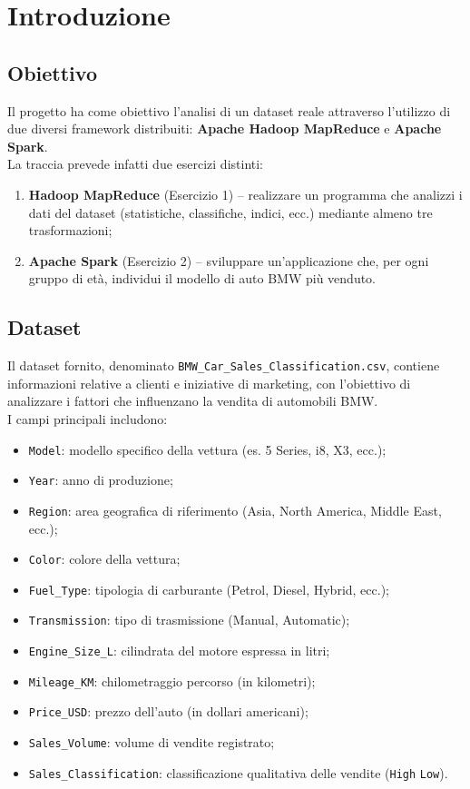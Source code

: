 \chapter{Introduzione}
	
	\section{Obiettivo}
		Il progetto ha come obiettivo l’analisi di un dataset reale attraverso l’utilizzo di due diversi framework distribuiti: \textbf{Apache Hadoop MapReduce} e \textbf{Apache Spark}. \\
		La traccia prevede infatti due esercizi distinti:
		
		\begin{enumerate}
			\item \textbf{Hadoop MapReduce} (Esercizio 1) -- realizzare un programma che analizzi i dati del dataset (statistiche, classifiche, indici, ecc.) mediante almeno tre trasformazioni;
			\item \textbf{Apache Spark} (Esercizio 2) -- sviluppare un’applicazione che, per ogni gruppo di età, individui il modello di auto BMW più venduto.
		\end{enumerate}
	
	\section{Dataset}
		Il dataset fornito, denominato \texttt{BMW\_Car\_Sales\_Classification.csv}, contiene informazioni relative a clienti e iniziative di marketing, con l’obiettivo di analizzare i fattori che influenzano la vendita di automobili BMW. \\
		I campi principali includono:
		
		\begin{itemize}
			\item \texttt{Model}: modello specifico della vettura (es. 5 Series, i8, X3, ecc.);
			\item \texttt{Year}: anno di produzione;
			\item \texttt{Region}: area geografica di riferimento (Asia, North America, Middle East, ecc.);
			\item \texttt{Color}: colore della vettura;
			\item \texttt{Fuel\_Type}: tipologia di carburante (Petrol, Diesel, Hybrid, ecc.);
			\item \texttt{Transmission}: tipo di trasmissione (Manual, Automatic);
			\item \texttt{Engine\_Size\_L}: cilindrata del motore espressa in litri;
			\item \texttt{Mileage\_KM}: chilometraggio percorso (in kilometri);
			\item \texttt{Price\_USD}: prezzo dell’auto (in dollari americani);
			\item \texttt{Sales\_Volume}: volume di vendite registrato;
			\item \texttt{Sales\_Classification}: classificazione qualitativa delle vendite (\texttt{High} \/ \texttt{Low}).
		\end{itemize}
		
